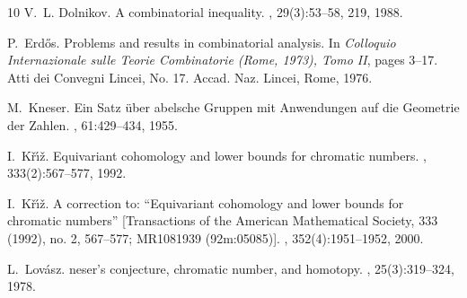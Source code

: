 \documentclass[11pt]{amsart}
\theoremstyle{definition}
\begin{document}
\begin{thebibliography}{10}
V.~L. Dol{\cprime}nikov.
\newblock A combinatorial inequality.
, 29(3):53--58, 219, 1988.

P.~Erd\H{o}s.
\newblock Problems and results in combinatorial analysis.
\newblock In {\em Colloquio {I}nternazionale sulle {T}eorie {C}ombinatorie
  ({R}ome, 1973), {T}omo {II}}, pages 3--17. Atti dei Convegni Lincei, No. 17.
  Accad. Naz. Lincei, Rome, 1976.

M.~Kneser.
\newblock Ein {S}atz \"uber abelsche {G}ruppen mit {A}nwendungen auf die
  {G}eometrie der {Z}ahlen.
, 61:429--434, 1955.

I.~K{\v{r}}{\'{\i}}{\v{z}}.
\newblock Equivariant cohomology and lower bounds for chromatic numbers.
,
  333(2):567--577, 1992.

I.~K{\v{r}}{\'{\i}}{\v{z}}.
\newblock A correction to: ``{E}quivariant cohomology and lower bounds for
  chromatic numbers'' [{T}ransactions of the {A}merican {M}athematical
  {S}ociety, {333} (1992), no. 2, 567--577; {MR}1081939 (92m:05085)].
,
  352(4):1951--1952, 2000.

L.~Lov{\'a}sz.
neser's conjecture, chromatic number, and homotopy.
, 25(3):319--324,
  1978.

\end{thebibliography}


%
%
\end{document}
